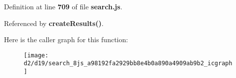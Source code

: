 Definition at line {\bf 709} of file {\bf search.\+js}.



Referenced by {\bf create\+Results()}.



Here is the caller graph for this function\+:
\nopagebreak
\begin{figure}[H]
\begin{center}
\leavevmode
\texttt{[image: d2/d19/search\_8js\_a98192fa2929bb8e4b0a890a4909ab9b2\_icgraph]}
\end{center}
\end{figure}


